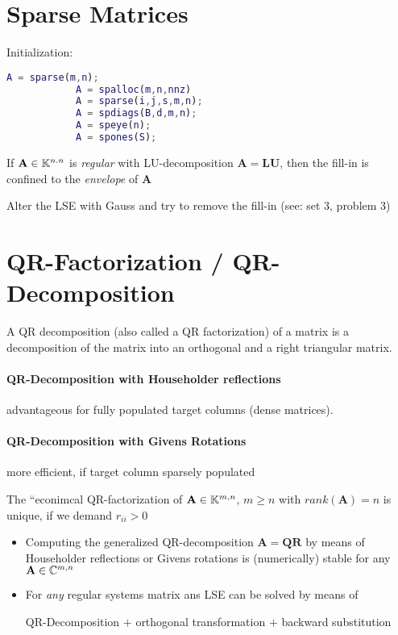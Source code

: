 	\section{Sparse Matrices}
		Initialization:
		\begin{lstlisting}[language=matlab]
			A = sparse(m,n);
			A = spalloc(m,n,nnz)
			A = sparse(i,j,s,m,n);
			A = spdiags(B,d,m,n);
			A = speye(n);
			A = spones(S);
		\end{lstlisting}

	

		\begin{theorem}
			If $\mathbf A \in \mathbb{K}^{n.n}$ is \emph{regular} with LU-decomposition $\mathbf A = \mathbf{LU}$, then the fill-in is confined to the \emph{envelope} of $\mathbf A$
		\end{theorem}
		\begin{notice}
			Alter the LSE with Gauss and try to remove the fill-in (see: set 3, problem 3)
		\end{notice}
	\section{QR-Factorization / QR-Decomposition}
		A QR decomposition (also called a QR factorization) of a matrix is a decomposition of the matrix into an orthogonal and a right triangular matrix.
		\paragraph{QR-Decomposition with Householder reflections} advantageous for fully populated target columns (dense matrices).
		\paragraph{QR-Decomposition with Givens Rotations} more efficient, if target column sparsely populated

		\begin{lemma}
			The ``econimcal QR-factorization of $\mathbf A \in \mathbb{K}^{m,n}$, $m \geq n$ with $rank(\mathbf A)=n$ is unique, if we demand $r_{ii} > 0$
		\end{lemma}

		\begin{notice}
			\begin{itemize}
				\item Computing the generalized QR-decomposition $\mathbf A = \mathbf{QR}$ by means of Householder reflections or Givens rotations is (numerically) stable for any $\mathbf A \in \mathbb{C}^{m,n}$
				\item For \emph{any} regular systems matrix ans LSE can be solved by means of
				\begin{center}
					QR-Decomposition $\mathbf +$ orthogonal transformation $\mathbf +$ backward substitution
				\end{center}

			\end{itemize}
		\end{notice}

